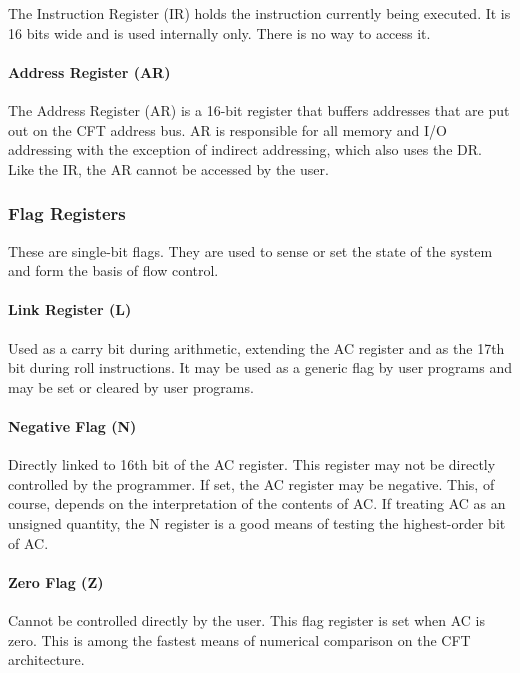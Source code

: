 \documentclass[11pt,a4paper,twocolumns]{article}
\newcommand\register[1]{\textsf{#1}}
\newcommand\A{\register{AC}}
\newcommand\Lreg{\register{L}}
\newcommand\Zreg{\register{Z}}
\newcommand\Nreg{\register{N}}
\newcommand\AR{\register{AR}}
\newcommand\DR{\register{DR}}
\newcommand\IR{\register{IR}}
\begin{document}
The Instruction Register (\IR) holds the instruction currently being
executed. It is 16 bits wide and is used internally only. There is no
way to access it.

\paragraph{Address Register (\AR)}

The Address Register (\AR) is a 16-bit register that buffers addresses
that are put out on the CFT address bus. \AR{} is responsible for all
memory and I/O addressing with the exception of indirect addressing,
which also uses the \DR. Like the \IR, the {\AR} cannot be accessed by
the user.

\subsubsection{Flag Registers}

These are single-bit flags. They are used to sense or set the state of
the system and form the basis of flow control.

\paragraph{Link Register (\Lreg)}

Used as a carry bit during arithmetic, extending the \A{} register and
as the 17th bit during roll instructions. It may be used as a generic
flag by user programs and may be set or cleared by user programs.

\paragraph{Negative Flag (\Nreg)}

Directly linked to 16th bit of the \A{} register. This register may
not be directly controlled by the programmer. If set, the \A{}
register may be negative. This, of course, depends on the
interpretation of the contents of \A{}. If treating \A{} as an
unsigned quantity, the \Nreg{} register is a good means of testing the
highest-order bit of \A{}.

\paragraph{Zero Flag (\Zreg)}

Cannot be controlled directly by the user. This flag register is set
when \A{} is zero. This is among the fastest means of numerical
comparison on the CFT architecture.
\end{document}
